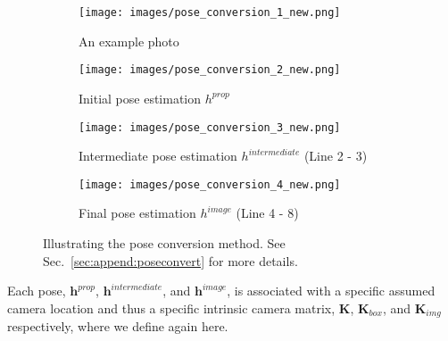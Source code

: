 \documentclass[final]{cvpr}
\begin{document}
\begin{figure*}[!t]
    \centering
    \begin{subfigure}{.45\textwidth}
      \centering
      \texttt{[image: images/pose\_conversion\_1\_new.png]}  
      \caption{An example photo}
      \label{fig:pose_photo}
    \end{subfigure}
    \begin{subfigure}{.45\textwidth}
      \centering
      \texttt{[image: images/pose\_conversion\_2\_new.png]}  
      \caption{Initial pose estimation $h^{prop}$}
      \label{fig:initial_pose}
    \end{subfigure}
    \newline
    \begin{subfigure}{.45\textwidth}
      \centering
      \texttt{[image: images/pose\_conversion\_3\_new.png]}  
      \caption{Intermediate pose estimation $h^{intermediate}$ (Line 2 - 3)}
      \label{fig:intermediate_pose}
    \end{subfigure}
    \begin{subfigure}{.45\textwidth}
      \centering
      \texttt{[image: images/pose\_conversion\_4\_new.png]}  
      \caption{Final pose estimation $h^{image}$ (Line 4 - 8)}
      \label{fig:final_pose}
    \end{subfigure}
    \caption{Illustrating the pose conversion method. See Sec.~\ref{sec:append:poseconvert} for more details.}
    \label{fig:fig}
\end{figure*}

Each pose, $\mathbf{h}^{prop}$, $\mathbf{h}^{intermediate}$, and $\mathbf{h}^{image}$, is associated with a specific assumed camera location and thus a specific intrinsic camera matrix, $\mathbf{K}$, $\mathbf{K}_{box}$, and $\mathbf{K}_{img}$ respectively, where we define again here. 
\end{document}
